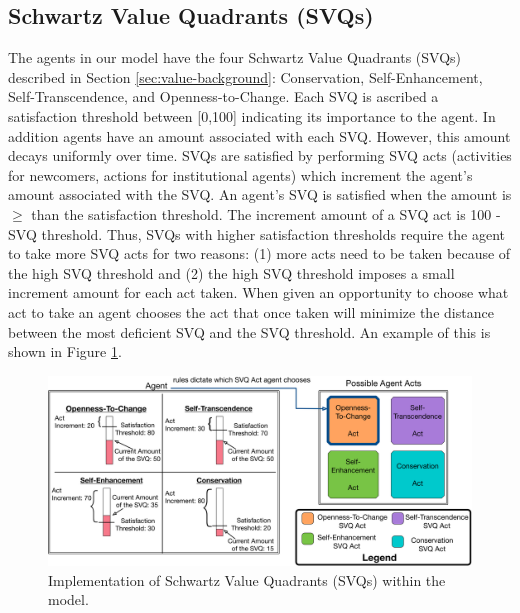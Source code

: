 \documentclass{scspaperproc}
\theoremstyle{scsthe}
\begin{document}
\subsection{Schwartz Value Quadrants (SVQs)} 
The agents in our model have the four Schwartz Value Quadrants (SVQs) described in Section \ref{sec:value-background}: Conservation, Self-Enhancement, Self-Transcendence, and Openness-to-Change. Each SVQ is ascribed a satisfaction threshold between [0,100] indicating its importance to the agent. In addition agents have an amount associated with each SVQ. However, this amount decays uniformly over time. SVQs are satisfied by performing SVQ acts (activities for newcomers, actions for institutional agents) which increment the agent's amount associated with the SVQ. An agent's SVQ is satisfied when the amount is $\geq$ than the satisfaction threshold. The increment amount of a SVQ act is 100 - SVQ threshold. Thus, SVQs with higher satisfaction thresholds require the agent to take more SVQ acts for two reasons: (1) more acts need to be taken because of the high SVQ threshold and (2) the high SVQ threshold imposes a small increment amount for each act taken. When given an opportunity to choose what act to take an agent chooses the act that once taken will minimize the distance between the most deficient SVQ and the SVQ threshold. An example of this is shown in Figure \ref{fig:agent-val}.

\begin{figure}[htb]
{
\centering
\includegraphics[width=0.65\columnwidth]{Agent-Value-In-Model.png}
\caption{Implementation of Schwartz Value Quadrants (SVQs) within the model.}
\label{fig:agent-val}
}
\end{figure}
\end{document}
